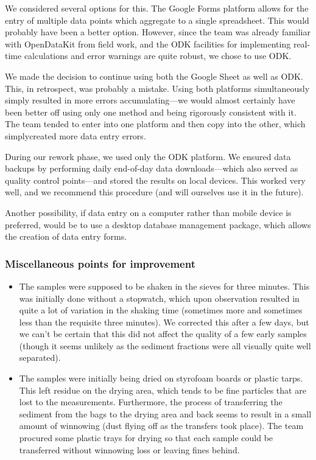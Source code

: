\documentclass[a4paper,12pt,twoside]{article}
\begin{document}
We considered several options for this. The Google Forms platform allows for the entry of multiple data points which aggregate to a single spreadsheet. This would probably have been a better option. However, since the team was already familiar with OpenDataKit from field work, and the ODK facilities for implementing real-time calculations and error warnings are quite robust, we chose to use ODK.

We made the decision to continue using both the Google Sheet as well as ODK. This, in retrospect, was probably a mistake. Using both platforms simultaneously simply resulted in more errors accumulating---we would almost certainly have been better off using only one method and being rigorously consistent with it. The team tended to enter into one platform and then copy into the other, which simplycreated more data entry errors.

During our rework phase, we used only the ODK platform. We ensured data backups by performing daily end-of-day data downloads---which also served as quality control points---and stored the results on local devices. This worked very well, and we recommend this procedure (and will ourselves use it in the future).

Another possibility, if data entry on a computer rather than mobile device is preferred, would be to use a desktop database management package, which allows the creation of data entry forms.

\color{RHblue}
\subsubsection{Miscellaneous points for improvement}
\color{RHgrey}
\begin{itemize}
  \item The samples were supposed to be shaken in the sieves for three minutes. This was initially done without a stopwatch, which upon observation resulted in quite a lot of variation in the shaking time (sometimes more and sometimes less than the requisite three minutes). We corrected this after a few days, but we can't be certain that this did not affect the quality of a few early samples (though it seems unlikely as the sediment fractions were all visually quite well separated).
  \item The samples were initially being dried on styrofoam boards or plastic tarps. This left residue on the drying area, which tends to be fine particles that are lost to the measurements. Furthermore, the process of transferring the sediment from the bags to the drying area and back seems to result in a small amount of winnowing (dust flying off as the transfers took place). The team procured some plastic trays for drying so that each sample could be transferred without winnowing loss or leaving fines behind.
\end{itemize}
\end{document}
